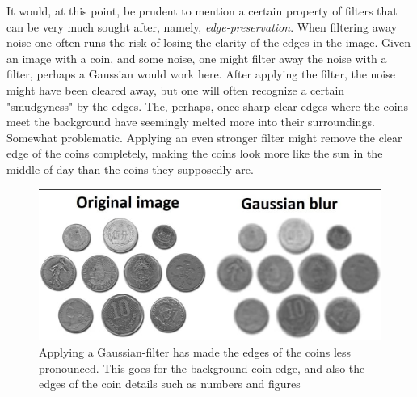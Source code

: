 \documentclass[twoside,a4paper,article]{combine}
\begin{document}
It would, at this point, be prudent to mention a certain property of filters that can be very much sought after, namely, \textit{edge-preservation}. When filtering away noise one often runs the risk of losing the clarity of the edges in the image. Given an image with a coin, and some noise, one might filter away the noise with a filter, perhaps a Gaussian would work here. After applying the filter, the noise might have been cleared away, but one will often recognize a certain "smudgyness" by the edges. The, perhaps, once sharp clear edges where the coins meet the background have seemingly melted more into their surroundings. Somewhat problematic. Applying an even stronger filter might remove the clear edge of the coins completely, making the coins look more like the sun in the middle of day than the coins they supposedly are.
\begin{figure}[H]
    \centering
    \includegraphics[width=1\linewidth]{coins.PNG}
    \caption{Applying a Gaussian-filter has made the edges of the coins less pronounced. This goes for the background-coin-edge, and also the edges of the coin details such as numbers and figures}
    \label{fig:enter-label}
\end{figure}
\end{document}

